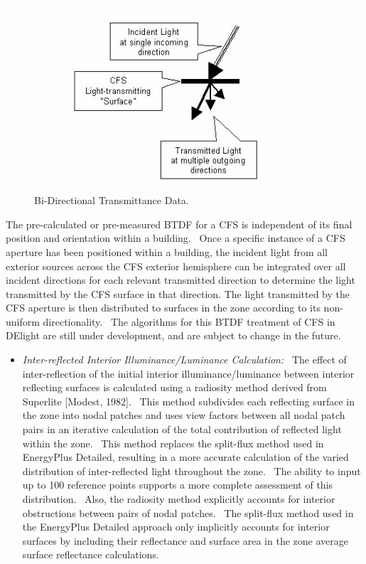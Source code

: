 \begin{figure}[hbtp] %
\centering
\includegraphics[width=0.9\textwidth, height=0.9\textheight, keepaspectratio=true]{media/image827.png}
\caption{Bi-Directional Transmittance Data. \protect \label{fig:bi-directional-transmittance-data.}}
\end{figure}

The pre-calculated or pre-measured BTDF for a CFS is independent of its final position and orientation within a building.~ Once a specific instance of a CFS aperture has been positioned within a building, the incident light from all exterior sources across the CFS exterior hemisphere can be integrated over all incident directions for each relevant transmitted direction to determine the light transmitted by the CFS surface in that direction. The light transmitted by the CFS aperture is then distributed to surfaces in the zone according to its non-uniform directionality.~ The algorithms for this BTDF treatment of CFS in DElight are still under development, and are subject to change in the future.

\begin{itemize}
\tightlist
\item
  \emph{Inter-reflected Interior Illuminance/Luminance Calculation:}~ The effect of inter-reflection of the initial interior illuminance/luminance between interior reflecting surfaces is calculated using a radiosity method derived from Superlite {[}Modest, 1982{]}.~ This method subdivides each reflecting surface in the zone into nodal patches and uses view factors between all nodal patch pairs in an iterative calculation of the total contribution of reflected light within the zone.~ This method replaces the split-flux method used in EnergyPlus Detailed, resulting in a more accurate calculation of the varied distribution of inter-reflected light throughout the zone.~ The ability to input up to 100 reference points supports a more complete assessment of this distribution.~ Also, the radiosity method explicitly accounts for interior obstructions between pairs of nodal patches.~ The split-flux method used in the EnergyPlus Detailed approach only implicitly accounts for interior surfaces by including their reflectance and surface area in the zone average surface reflectance calculations.
\end{itemize}

